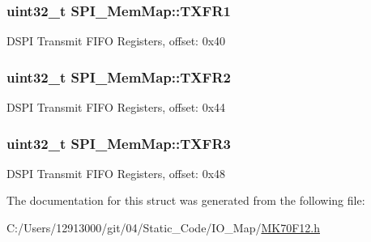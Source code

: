 \subsubsection[{T\+X\+F\+R1}]{\setlength{\rightskip}{0pt plus 5cm}uint32\+\_\+t S\+P\+I\+\_\+\+Mem\+Map\+::\+T\+X\+F\+R1}\label{struct_s_p_i___mem_map_aa4c8bc4c6c43cb03d266084ead4948f6}
D\+S\+P\+I Transmit F\+I\+F\+O Registers, offset\+: 0x40 \hypertarget{struct_s_p_i___mem_map_a2e65235ded22e36d3dae2b17f172a32b}{}
\subsubsection[{T\+X\+F\+R2}]{\setlength{\rightskip}{0pt plus 5cm}uint32\+\_\+t S\+P\+I\+\_\+\+Mem\+Map\+::\+T\+X\+F\+R2}\label{struct_s_p_i___mem_map_a2e65235ded22e36d3dae2b17f172a32b}
D\+S\+P\+I Transmit F\+I\+F\+O Registers, offset\+: 0x44 \hypertarget{struct_s_p_i___mem_map_a817203724ca73f53cc544f887eeabd27}{}
\subsubsection[{T\+X\+F\+R3}]{\setlength{\rightskip}{0pt plus 5cm}uint32\+\_\+t S\+P\+I\+\_\+\+Mem\+Map\+::\+T\+X\+F\+R3}\label{struct_s_p_i___mem_map_a817203724ca73f53cc544f887eeabd27}
D\+S\+P\+I Transmit F\+I\+F\+O Registers, offset\+: 0x48 

The documentation for this struct was generated from the following file\+:\begin{DoxyCompactItemize}
\item 
C\+:/\+Users/12913000/git/04/\+Static\+\_\+\+Code/\+I\+O\+\_\+\+Map/\hyperlink{_m_k70_f12_8h}{M\+K70\+F12.\+h}\end{DoxyCompactItemize}
